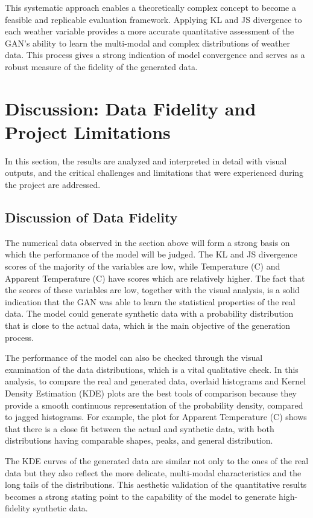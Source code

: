 \documentclass[12pt, draftclsnofoot, onecolumn]{IEEEtran}
\begin{document}
This systematic approach enables a theoretically complex concept to become a feasible and replicable evaluation framework. Applying KL and JS divergence to each weather variable provides a more accurate quantitative assessment of the GAN’s ability to learn the multi-modal and complex distributions of weather data. This process gives a strong indication of model convergence and serves as a robust measure of the fidelity of the generated data.



\section{Discussion: Data Fidelity and Project Limitations}

In this section, the results are analyzed and interpreted in detail with visual outputs, and the critical challenges and limitations that were experienced during the project are addressed.

\subsection{Discussion of Data Fidelity}
The numerical data observed in the section above will form a strong basis on which the performance of the model will be judged. The KL and JS divergence scores of the majority of the variables are low, while Temperature (C) and Apparent Temperature (C) have scores which are relatively higher. The fact that the scores of these variables are low, together with the visual analysis, is a solid indication that the GAN was able to learn the statistical properties of the real data. The model could generate synthetic data with a probability distribution that is close to the actual data, which is the main objective of the generation process.

The performance of the model can also be checked through the visual examination of the data distributions, which is a vital qualitative check. In this analysis, to compare the real and generated data, overlaid histograms and Kernel Density Estimation (KDE) plots are the best tools of comparison because they provide a smooth continuous representation of the probability density, compared to jagged histograms. For example, the plot for Apparent Temperature (C) shows that there is a close fit between the actual and synthetic data, with both distributions having comparable shapes, peaks, and general distribution.

The KDE curves of the generated data are similar not only to the ones of the real data but they also reflect the more delicate, multi-modal characteristics and the long tails of the distributions. This aesthetic validation of the quantitative results becomes a strong stating point to the capability of the model to generate high-fidelity synthetic data.
\end{document}
